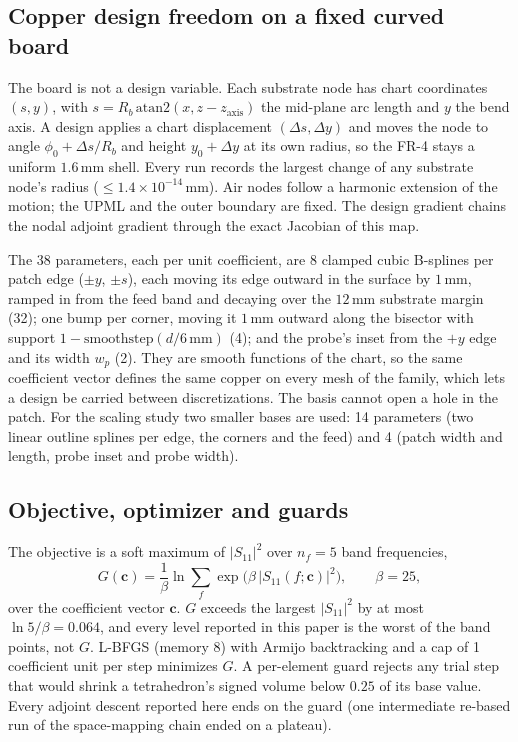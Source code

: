 \documentclass{anvil-paper}
\begin{document}
\subsection{Copper design freedom on a fixed curved board}
\label{sec:freedom}

The board is not a design variable. Each substrate node has chart
coordinates $(s, y)$, with $s = R_b\,\mathrm{atan2}(x, z - z_{\mathrm{axis}})$
the mid-plane arc length and $y$ the bend axis. A design applies a chart
displacement $(\Delta s, \Delta y)$ and moves the node to angle
$\phi_0 + \Delta s/R_b$ and height $y_0 + \Delta y$ at its own radius, so
the FR-4 stays a uniform $1.6$\,mm shell. Every run records the largest
change of any substrate node's radius ($\le 1.4\times10^{-14}$\,mm). Air
nodes follow a harmonic extension of the motion; the UPML and the outer
boundary are fixed. The design gradient chains the nodal adjoint gradient
through the exact Jacobian of this map.

The 38 parameters, each per unit coefficient, are $8$ clamped cubic
B-splines per patch edge ($\pm y$, $\pm s$), each moving its edge outward in
the surface by $1$\,mm, ramped in from the feed band and decaying over the
$12$\,mm substrate margin (32); one bump per corner, moving it $1$\,mm
outward along the bisector with support $1 - \mathrm{smoothstep}(d/6\,\mathrm{mm})$
(4); and the probe's inset from the $+y$ edge and its width $w_p$ (2). They
are smooth functions of the chart, so the same coefficient vector defines
the same copper on every mesh of the family, which lets a design be carried
between discretizations. The basis cannot open a hole in the patch. For the
scaling study two smaller bases are used: 14 parameters (two linear outline
splines per edge, the corners and the feed) and 4 (patch width and length,
probe inset and probe width).

\subsection{Objective, optimizer and guards}
\label{sec:objective}

The objective is a soft maximum of $|S_{11}|^2$ over $n_f = 5$ band
frequencies,
\begin{equation}
  G(\mathbf{c}) = \frac{1}{\beta}\ln \sum_{f} \exp\!\big(\beta\,|S_{11}(f;\mathbf{c})|^2\big),
  \qquad \beta = 25,
  \label{eq:objective}
\end{equation}
over the coefficient vector $\mathbf{c}$. $G$ exceeds the largest
$|S_{11}|^2$ by at most $\ln 5/\beta = 0.064$, and every level reported in
this paper is the worst of the band points, not $G$. L-BFGS (memory 8) with
Armijo backtracking and a cap of 1 coefficient unit per step minimizes $G$.
A per-element guard rejects any trial step that would shrink a
tetrahedron's signed volume below $0.25$ of its base value. Every adjoint
descent reported here ends on the guard (one intermediate re-based run of
the space-mapping chain ended on a plateau).
\end{document}
